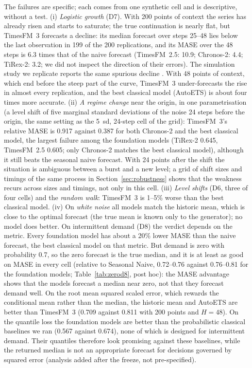 The failures are specific; each comes from one synthetic cell and is descriptive, without a test. (i) \emph{Logistic growth} (D7). With 200 points of context the series has already
risen and starts to saturate; the true continuation is nearly flat, but TimesFM~3 forecasts a decline: its
median forecast over steps 25--48 lies below the last observation in 199 of the 200 replications, and its MASE over the 48 steps is 6.3 times that of
the naive forecast (TimesFM~2.5: 10.9; Chronos-2: 4.4; TiRex-2: 3.2; we did not inspect the direction of their errors). The simulation study we replicate reports the same spurious
decline \citep{ebrahim2026foundation}. With 48 points of context, which end before the steep part of the curve, TimesFM~3
under-forecasts the rise in almost every replication, and the best classical model (AutoETS) is about four times more accurate.
(ii) \emph{A regime change} near the origin, in one parametrisation (a level shift of five marginal standard deviations of the noise 24
steps before the origin, the same setting as the 5~sd, 24-step cell of the grid): TimesFM~3's relative MASE is 0.917 against 0.387 for both Chronos-2 and the best classical model, the
largest failure among the foundation models (TiRex-2 0.645, TimesFM~2.5 0.605; only Chronos-2 matches the best classical model),
although it still beats the seasonal naive forecast. With 24 points
after the shift the situation is ambiguous between a burst and a new level; a grid of shift sizes and timings of the same process in
Section~\ref{sec:robustness} shows that the weakness recurs across sizes and timings, not only in this cell. (iii) \emph{Level shifts} (D6, three of four cells) and the
\emph{random walk}: TimesFM~3 is 1--5\% worse than the best classical model. (iv) On \emph{white noise} all models match the historic mean, which is close to the optimal forecast (the true mean is known
only to the generator); no model does better. On intermittent demand (D8) the
verdict depends on the metric. Every foundation model has about a 20\% lower MASE than the naive forecast, the best classical
model on that metric. But demand is zero with probability 0.7, so the zero forecast is the true median, and it is at least as
good on MASE in every cell (relative to Seasonal Naive, 0.72--0.76 against 0.76--0.81 for the foundation models;
Table~\ref{tab:zerod8}, post hoc): the MASE advantage shows
that the models forecast a median near zero, not that they forecast demand well. On the root mean squared scaled error, which
rewards the conditional mean rather than the median, the historic mean and AutoETS are better than TimesFM~3 (0.709 against 0.811
with 200 points and $H = 48$). On the quantile loss the foundation models are better than the probabilistic classical baselines
we ran (0.567 against 0.674), none of which is designed for intermittent demand. Their quantiles therefore look promising against
these baselines, while the returned median is not an appropriate forecast for decisions governed by squared error (analysis
added after the freeze, not pre-specified).

